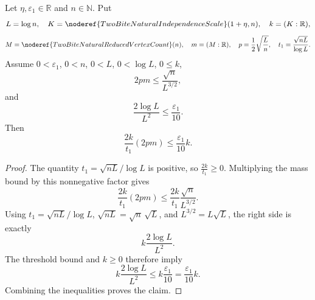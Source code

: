 \begin{helper}
Let \(\eta,\varepsilon_1\in\mathbb R\) and \(n\in\mathbb N\).  Put
\[
L=\log n,\quad
K=\noderef{TwoBiteNaturalIndependenceScale}(1+\eta,n),\quad k=(K:\mathbb R),
\]
\[
M=\noderef{TwoBiteNaturalReducedVertexCount}(n),\quad m=(M:\mathbb R),
\quad
p=\frac12\sqrt{\frac Ln},\quad
t_1=\frac{\sqrt{nL}}{\log L}.
\]
Assume \(0<\varepsilon_1\), \(0<n\), \(0<L\), \(0<\log L\), \(0\le k\),
\[
2pm\le\frac{\sqrt n}{L^{3/2}},
\]
and
\[
\frac{2\log L}{L^2}\le\frac{\varepsilon_1}{10}.
\]
Then
\[
\frac{2k}{t_1}(2pm)\le\frac{\varepsilon_1}{10}k.
\]
\end{helper}
\begin{proof}
The quantity \(t_1=\sqrt{nL}/\log L\) is positive, so
\(\frac{2k}{t_1}\ge0\).  Multiplying the mass bound by this nonnegative
factor gives
\[
\frac{2k}{t_1}(2pm)
\le \frac{2k}{t_1}\frac{\sqrt n}{L^{3/2}}.
\]
Using \(t_1=\sqrt{nL}/\log L\), \(\sqrt{nL}=\sqrt n\,\sqrt L\), and
\(L^{3/2}=L\sqrt L\), the right side is exactly
\[
k\frac{2\log L}{L^2}.
\]
The threshold bound and \(k\ge0\) therefore imply
\[
k\frac{2\log L}{L^2}\le k\frac{\varepsilon_1}{10}
=\frac{\varepsilon_1}{10}k.
\]
Combining the inequalities proves the claim.
\end{proof}
